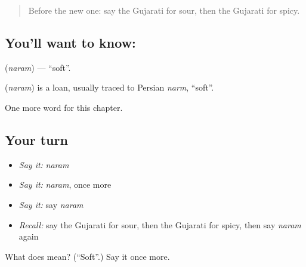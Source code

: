 \label{lesson:GU-C132-naram}



\begin{quote}
Before the new one: say the Gujarati for sour, then the Gujarati for spicy.
\end{quote}

\subsection*{You'll want to know: }
\textbf{} (\emph{naram}) — \textquotedblleft{}soft\textquotedblright{}.

\begin{cousinweb}
\textbf{} (\emph{naram}) is a loan, usually traced to Persian \emph{narm}, \textquotedblleft{}soft\textquotedblright{}.
\end{cousinweb}

\begin{grammarlens}[title={What you've built}]
One more word for this chapter.
\end{grammarlens}

\subsection*{Your turn}
\begin{itemize}
\raggedright
  \item \emph{Say it:} \emph{naram}
  \item \emph{Say it:} \emph{naram}, once more
  \item \emph{Say it:} say \emph{naram}
  \item \emph{Recall:} say the Gujarati for sour, then the Gujarati for spicy, then say \emph{naram} again
\end{itemize}

\begin{tcolorbox}[breakable,colback=teal!4,colframe=teal!35!black,title={Before you move on}]
What does  mean? (\textquotedblleft{}Soft\textquotedblright{}.) Say it once more.
\end{tcolorbox}
